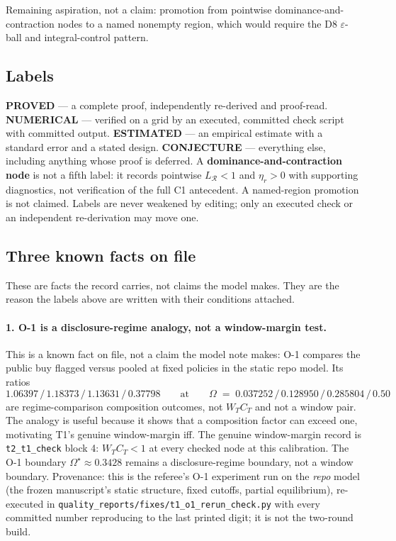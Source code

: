 \documentclass[11pt,a4paper]{article}
\begin{document}
\noindent Remaining aspiration, not a claim: promotion from pointwise
dominance-and-contraction nodes to a named nonempty region, which would require the
D8 $\varepsilon$-ball and integral-control pattern.

\subsection*{Labels}

\textbf{PROVED} --- a complete proof, independently re-derived and proof-read.
\textbf{NUMERICAL} --- verified on a grid by an executed, committed check script with
committed output. \textbf{ESTIMATED} --- an empirical estimate with a standard error
and a stated design. \textbf{CONJECTURE} --- everything else, including anything
whose proof is deferred. A \textbf{dominance-and-contraction node} is not a fifth
label: it records pointwise $L_{\mathcal R}<1$ and $\eta_r>0$ with supporting
diagnostics, not verification of the full C1 antecedent. A named-region promotion is
not claimed. Labels are never weakened by editing; only an executed check or an
independent re-derivation may move one.

\subsection{Three known facts on file}
\label{sec:facts}

These are facts the record carries, not claims the model makes. They are the reason
the labels above are written with their conditions attached.

\paragraph{1. O-1 is a disclosure-regime analogy, not a window-margin test.}
This is a known fact on file, not a claim the model note makes: O-1 compares the
public buy flagged versus pooled at fixed policies in the static repo model. Its
ratios
\[
1.06397 \,/\, 1.18373 \,/\, 1.13631 \,/\, 0.37798
\qquad\text{at}\qquad
\Omega \;=\; 0.037252 \,/\, 0.128950 \,/\, 0.285804 \,/\, 0.50
\]
are regime-comparison composition outcomes, not $W_TC_T$ and not a window pair. The
analogy is useful because it shows that a composition factor can exceed one,
motivating T1's genuine window-margin iff. The genuine window-margin record is
\texttt{t2\_t1\_check} block 4: $W_TC_T<1$ at every checked node at this calibration.
The O-1 boundary $\Omega^\star\approx0.3428$ remains a disclosure-regime boundary,
not a window boundary. Provenance: this is the referee's O-1 experiment run on
the \emph{repo} model (the frozen manuscript's static structure, fixed cutoffs,
partial equilibrium), re-executed in \texttt{quality\_reports/fixes/t1\_o1\_rerun\_check.py}
with every committed number reproducing to the last printed digit; it is not the
two-round build.
\end{document}
